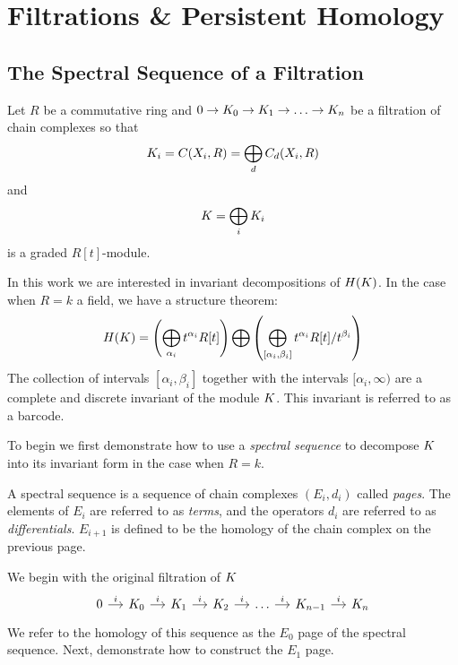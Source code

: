 \chapter{Filtrations \& Persistent Homology}
\section{The Spectral Sequence of a Filtration}
Let $R$ be a commutative ring and $0 \rightarrow K_0 \rightarrow K_1 \rightarrow  \ldots \rightarrow  K_n$ 
be a filtration of chain complexes so that \[ K_i = C(X_i, R) = \bigoplus_d C_d(X_i, R)\]
and  \[ K = \bigoplus_i K_i \] is a graded $R[t]$-module.

In this work we are interested in invariant decompositions of $H(K)$. In the case when $R = k$ a field, we have a structure theorem:
\[ H(K)= \left( \bigoplus_{\alpha_i}t^{\alpha_i}R[t] \right) \bigoplus \left( \bigoplus_{[\alpha_i, \beta_i]} t^{\alpha_i}R[t]/t^{\beta_i}  \right)  \]
The collection of intervals $[\alpha_i,\beta_i]$ together with the intervals $[\alpha_i, \infty)$ are a complete and discrete invariant 
of the module $K$. This invariant is referred to as a barcode.

To begin we first demonstrate how to use a \emph{spectral sequence} to decompose $K$ into its invariant form in the case when $R = k$.

A spectral sequence is a sequence of chain complexes $(E_i, d_i)$ called \emph{pages}. The elements of $E_i$ are referred to as \emph{terms}, and the operators $d_i$ are 
referred to as \emph{differentials}.  $E_{i+1}$ is defined to be the homology of the chain complex on the previous page.

\noindent We begin with the original filtration of $K$
\[
\begin{tikzcd} [column sep=small]
0 \arrow{r}{i} & \K_0 \arrow{r}{i} & \K_1 \arrow{r}{i}   & \K_2 \arrow{r}{i} & \ldots \arrow{r}{i} & \K_{n-1} \arrow{r}{i} & \K_n
\end{tikzcd}
\]
We refer to the homology of this sequence as the $E_0$ page of the spectral sequence. Next, demonstrate how to construct the $E_1$ page.

